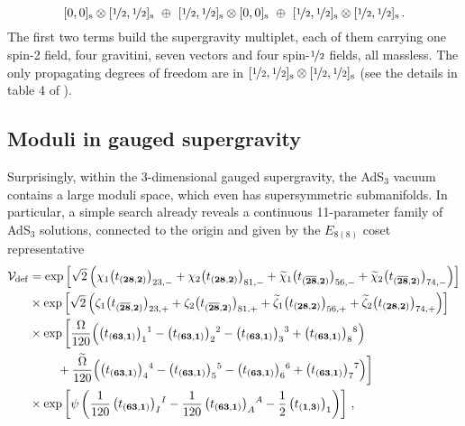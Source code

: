 \documentclass[a4paper, 11pt]{article}
\numberwithin{equation}{section}
\newcommand{\ts}[1]{\widetilde{#1}}
\newcommand{\ov}[1]{\overline{#1}}
\newcommand{\EE}{\ensuremath{E_{8(8)}}\xspace}
\newcommand{\+}{\oplus}
\newcommand{\fl}[1]{\ov{#1}}
\begin{document}
\begin{equation} \label{eq:CTmultorigin}
	[0,0]_{\rm s} \otimes [\nicefrac{1}{2},\nicefrac{1}{2}]_{\rm s} \ \oplus \ [\nicefrac{1}{2},\nicefrac{1}{2}]_{\rm s} \otimes [0,0]_{\rm s} \ \oplus \ [\nicefrac{1}{2},\nicefrac{1}{2}]_{\rm s} \otimes [\nicefrac{1}{2},\nicefrac{1}{2}]_{\rm s}\,.
\end{equation}
The first two terms build the supergravity multiplet, each of them carrying one spin-2 field, four gravitini, seven vectors and four spin-$\nicefrac{1}{2}$ fields, all massless. The only propagating degrees of freedom are in $[\nicefrac{1}{2},\nicefrac{1}{2}]_{\rm s}\otimes[\nicefrac{1}{2},\nicefrac{1}{2}]_{\rm s}$ (see the details in table 4 of \cite{Hohm:2005ui}).

\subsection{Moduli in gauged supergravity}
Surprisingly, within the 3-dimensional gauged supergravity, the AdS$_3$ vacuum contains a large moduli space, which even has supersymmetric submanifolds. In particular, a simple search already reveals a continuous 11-parameter family of AdS$_3$ solutions, connected to the origin and given by the \EE coset representative
\begin{equation} \label{eq:FullDeformation}
	\begin{split}
		{\cal V}_{\rm def} &= \exp\left[\sqrt{2}\left(\chi_{1}\big(t_{(\mathbf{28},\mathbf{2})}\big)_{23,-}+\chi_{2}\big(t_{(\mathbf{28},\mathbf{2})}\big)_{81,-}+\ts{\chi}_{1}\big(t_{(\mathbf{\fl{28}},\mathbf{2})}\big)_{56,-}+\ts{\chi}_{2}\big(t_{(\mathbf{\fl{28}},\mathbf{2})}\big)_{74,-}\right)\right] \\
		& \times \exp\left[\sqrt{2}\left(\zeta_{1}\big(t_{(\mathbf{\fl{28}},\mathbf{2})}\big)_{23,+}+\zeta_{2}\big(t_{(\mathbf{\fl{28}},\mathbf{2})}\big)_{81,+}+\ts{\zeta}_{1}\big(t_{(\mathbf{28},\mathbf{2})}\big)_{56,+}+\ts{\zeta}_{2}\big(t_{(\mathbf{28},\mathbf{2})}\big)_{74,+}\right)\right] \\
		& \times \exp\bigg[\frac{\Omega}{120}\Big(\big(t_{(\mathbf{63},\mathbf{1})}\big)_{1}{}^{1}-\big(t_{(\mathbf{63},\mathbf{1})}\big)_{2}{}^{2}-\big(t_{(\mathbf{63},\mathbf{1})}\big)_{3}{}^{3}+\big(t_{(\mathbf{63},\mathbf{1})}\big)_{8}{}^{8}\Big)\\
		&\ \qquad+\frac{\ts{\Omega}}{120}\Big(\big(t_{(\mathbf{63},\mathbf{1})}\big)_{4}{}^{4}-\big(t_{(\mathbf{63},\mathbf{1})}\big)_{5}{}^{5}-\big(t_{(\mathbf{63},\mathbf{1})}\big)_{6}{}^{6}+\big(t_{(\mathbf{63},\mathbf{1})}\big)_{7}{}^{7}\Big)\bigg] \\
		& \times \exp\left[\psi\left(\frac{1}{120}\,\big(t_{(\mathbf{63},\mathbf{1})}\big)_{I}{}^{I}-\frac{1}{120}\,\big(t_{(\mathbf{63},\mathbf{1})}\big)_{A}{}^{A}-\frac{1}{2}\,\big(t_{(\mathbf{1},\mathbf{3})}\big)_{1}\right)\right]\,,
	\end{split}
\end{equation}
\end{document}
